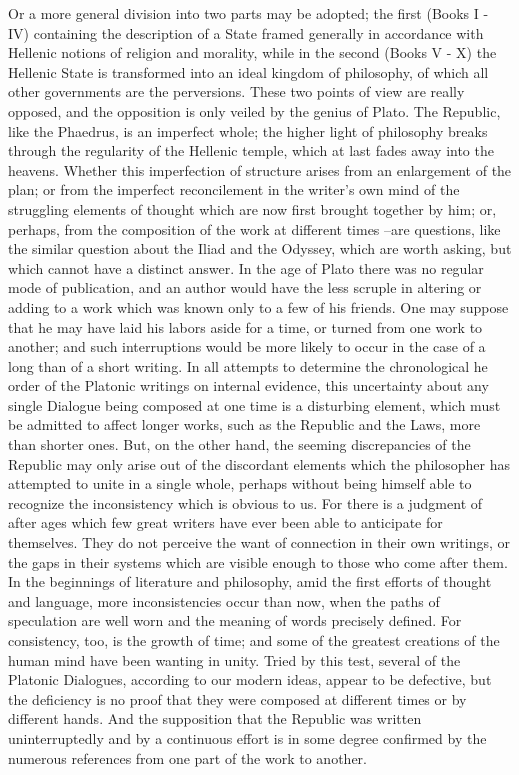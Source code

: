 Or a more general division into two parts may be adopted; the first (Books I - IV) containing the description of a State framed generally in accordance with Hellenic notions of religion and morality, while in the second (Books V - X) the Hellenic State is transformed into an ideal kingdom of philosophy, of which all other governments are the perversions. These two points of view are really opposed, and the opposition is only veiled by the genius of Plato. The Republic, like the Phaedrus, is an imperfect whole; the higher light of philosophy breaks through the regularity of the Hellenic temple, which at last fades away into the heavens. Whether this imperfection of structure arises from an enlargement of the plan; or from the imperfect reconcilement in the writer's own mind of the struggling elements of thought which are now first brought together by him; or, perhaps, from the composition of the work at different times --are questions, like the similar question about the Iliad and the Odyssey, which are worth asking, but which cannot have a distinct answer. In the age of Plato there was no regular mode of publication, and an author would have the less scruple in altering or adding to a work which was known only to a few of his friends. One may suppose that he may have laid his labors aside for a time, or turned from one work to another; and such interruptions would be more likely to occur in the case of a long than of a short writing. In all attempts to determine the chronological he order of the Platonic writings on internal evidence, this uncertainty about any single Dialogue being composed at one time is a disturbing element, which must be admitted to affect longer works, such as the Republic and the Laws, more than shorter ones. But, on the other hand, the seeming discrepancies of the Republic may only arise out of the discordant elements which the philosopher has attempted to unite in a single whole, perhaps without being himself able to recognize the inconsistency which is obvious to us. For there is a judgment of after ages which few great writers have ever been able to anticipate for themselves. They do not perceive the want of connection in their own writings, or the gaps in their systems which are visible enough to those who come after them. In the beginnings of literature and philosophy, amid the first efforts of thought and language, more inconsistencies occur than now, when the paths of speculation are well worn and the meaning of words precisely defined. For consistency, too, is the growth of time; and some of the greatest creations of the human mind have been wanting in unity. Tried by this test, several of the Platonic Dialogues, according to our modern ideas, appear to be defective, but the deficiency is no proof that they were composed at different times or by different hands. And the supposition that the Republic was written uninterruptedly and by a continuous effort is in some degree confirmed by the numerous references from one part of the work to another.

